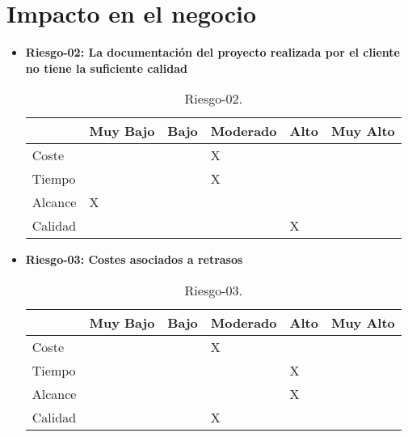 \section{Impacto en el negocio}
\begin{itemize}
	\item \textbf{Riesgo-02: La documentación del proyecto realizada por el cliente no tiene la suficiente calidad}
	\begin{table}[H]
	\begin{center}
	\begin{tabular}{ l l l l l l }
	\hline
	& Muy Bajo & Bajo & Moderado & Alto & Muy Alto \\ \hline \hline
	Coste &  &  & X &  &  \\ \hline
	Tiempo &  &  & X &  &  \\ \hline
	Alcance & X &  &  &  &  \\ \hline
	Calidad &  &  &  & X &  \\ \hline
	\end{tabular}
	\caption{Riesgo-02.}
	\label{Riesgo-02}
	\end{center}
	\end{table}
	\item \textbf{Riesgo-03: Costes asociados a retrasos}
	\begin{table}[H]
	\begin{center}
	\begin{tabular}{ l l l l l l }
	\hline
	& Muy Bajo & Bajo & Moderado & Alto & Muy Alto \\ \hline \hline
	Coste &  &  & X &  &  \\ \hline
	Tiempo &  &  &  & X &  \\ \hline
	Alcance &  &  &  & X &  \\ \hline
	Calidad &  &  & X &  &  \\ \hline
	\end{tabular}
	\caption{Riesgo-03.}
	\label{Riesgo-03}
	\end{center}
	\end{table}
\end{itemize}

